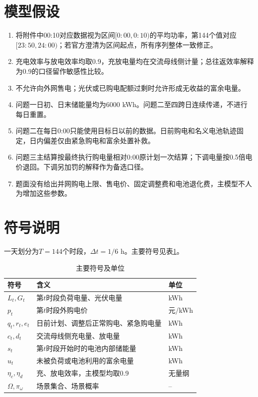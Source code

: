 \section{模型假设}

\begin{enumerate}[label=\textbf{A\arabic*.}]
  \item 将附件中00:10对应数据视为区间$[0{:}00,0{:}10)$的平均功率，第144个值对应$[23{:}50,24{:}00)$；若官方澄清为区间起点，所有序列整体一致修正。
  \item 充电效率与放电效率均取0.9，充放电量均在交流母线侧计量；总往返效率解释为0.9的口径留作敏感性比较。
  \item 不允许向外网售电；光伏或已购电配额过剩时允许形成无收益的富余电量。
  \item 问题一日初、日末储能量均为6000 kWh。问题二至四跨日连续传递，不进行每日重置。
  \item 问题二在每日0:00只能使用目标日以前的数据。日前购电和名义电池轨迹固定，日内偏差仅由紧急购电和富余处置补救。
  \item 问题三主结算按最终执行购电量相对0:00原计划一次结算；下调电量按0.5倍电价退回。下调另加罚的解释作为备选口径。
  \item 题面没有给出并网购电上限、售电价、固定调整费和电池退化费，主模型不人为增加这些参数。
\end{enumerate}

\section{符号说明}

一天划分为$T=144$个时段，$\Delta t=1/6$ h。主要符号见表\ref{tab:symbols}。

\begin{table}[H]
\centering
\caption{主要符号及单位}
\label{tab:symbols}
\begin{tabularx}{\textwidth}{>{\centering\arraybackslash}p{2.4cm}X>{\centering\arraybackslash}p{2.6cm}}
\toprule
符号 & 含义 & 单位 \\
\midrule
$L_t,G_t$ & 第$t$时段负荷电量、光伏电量 & kWh \\
$p_t$ & 第$t$时段外购电价 & 元/kWh \\
$q_t,r_t,e_t$ & 日前计划、调整后正常购电、紧急购电量 & kWh \\
$c_t,d_t$ & 交流母线侧充电量、放电量 & kWh \\
$s_t$ & 第$t$时段开始时的电池内部储能量 & kWh \\
$u_t$ & 未被负荷或电池利用的富余电量 & kWh \\
$\eta_c,\eta_d$ & 充、放电效率，主模型均取0.9 & 无量纲 \\
$\Omega,\pi_\omega$ & 场景集合、场景概率 & -- \\
\bottomrule
\end{tabularx}
\end{table}

